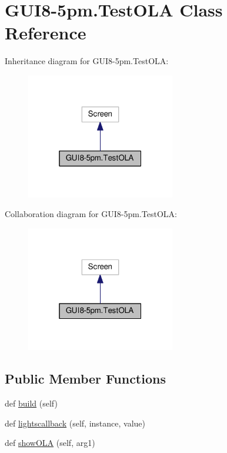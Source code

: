 \hypertarget{classGUI8-5pm_1_1TestOLA}{}\section{G\+U\+I8-\/5pm.Test\+O\+LA Class Reference}
\label{classGUI8-5pm_1_1TestOLA}


Inheritance diagram for G\+U\+I8-\/5pm.Test\+O\+LA\+:\nopagebreak
\begin{figure}[H]
\begin{center}
\leavevmode
\includegraphics[width=184pt]{classGUI8-5pm_1_1TestOLA__inherit__graph}
\end{center}
\end{figure}


Collaboration diagram for G\+U\+I8-\/5pm.Test\+O\+LA\+:\nopagebreak
\begin{figure}[H]
\begin{center}
\leavevmode
\includegraphics[width=184pt]{classGUI8-5pm_1_1TestOLA__coll__graph}
\end{center}
\end{figure}
\subsection*{Public Member Functions}
\begin{DoxyCompactItemize}
\item 
def \hyperlink{classGUI8-5pm_1_1TestOLA_a3dce3cf723de3b14a4479fc83e9502bc}{build} (self)
\item 
def \hyperlink{classGUI8-5pm_1_1TestOLA_af8d2acfcff4dc415a2fc5c9a60196132}{lightscallback} (self, instance, value)
\item 
def \hyperlink{classGUI8-5pm_1_1TestOLA_ad8b9a596b77b2aaad929c7ff2e34a6cd}{show\+O\+LA} (self, arg1)
\end{DoxyCompactItemize}
